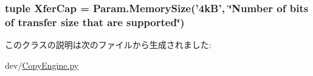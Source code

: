 \hypertarget{classCopyEngine_1_1CopyEngine_ae852302756ab6b484c727a185b42d98b}{
\subsubsection[{XferCap}]{\setlength{\rightskip}{0pt plus 5cm}tuple {\bf XferCap} = Param.MemorySize('4kB', \char`\"{}Number of bits of transfer size that are supported\char`\"{})}}
\label{classCopyEngine_1_1CopyEngine_ae852302756ab6b484c727a185b42d98b}


このクラスの説明は次のファイルから生成されました:\begin{DoxyCompactItemize}
\item 
dev/\hyperlink{CopyEngine_8py}{CopyEngine.py}\end{DoxyCompactItemize}
